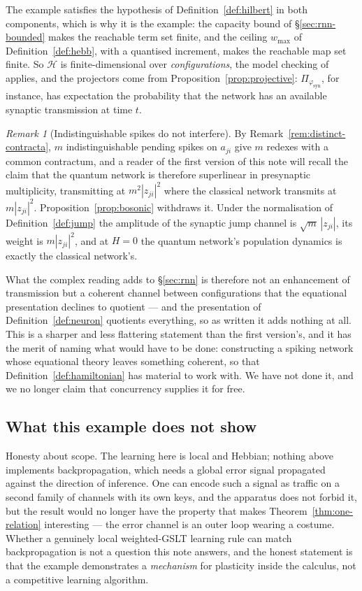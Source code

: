 \documentclass[11pt,a4paper]{article}
\theoremstyle{plain}
\theoremstyle{definition}
\theoremstyle{remark}
\newtheorem{remark}[theorem]{Remark}
\begin{document}
The example satisfies the hypothesis of Definition~\ref{def:hilbert} in both components, which is why
it is the example: the capacity bound of \S\ref{sec:rnn-bounded} makes the reachable term set finite,
and the ceiling $w_{\max}$ of Definition~\ref{def:hebb}, with a quantised increment, makes the
reachable map set finite. So $\mathcal{H}$ is finite-dimensional over \emph{configurations}, the
model checking of \cite{qctmc,qctmc-csl} applies, and the projectors come from
Proposition~\ref{prop:projective}: $\Pi_{\varphi_{\mathrm{syn}}}$, for instance, has expectation the
probability that the network has an available synaptic transmission at time $t$.

\begin{remark}[Indistinguishable spikes do not interfere]
\label{rem:bosonic}
By Remark~\ref{rem:distinct-contracta}, $m$ indistinguishable pending spikes on $a_{ji}$ give $m$
redexes with a common contractum, and a reader of the first version of this note will recall the
claim that the quantum network is therefore superlinear in presynaptic multiplicity, transmitting at
$m^2|z_{ji}|^2$ where the classical network transmits at $m|z_{ji}|^2$.
Proposition~\ref{prop:bosonic} withdraws it. Under the normalisation of Definition~\ref{def:jump} the
amplitude of the synaptic jump channel is $\sqrt{m}\,|z_{ji}|$, its weight is $m|z_{ji}|^2$, and at
$H = 0$ the quantum network's population dynamics is exactly the classical network's.

What the complex reading adds to \S\ref{sec:rnn} is therefore not an enhancement of transmission but
a coherent channel between configurations that the equational presentation declines to quotient ---
and the presentation of Definition~\ref{def:neuron} quotients everything, so as written it adds
nothing at all. This is a sharper and less flattering statement than the first version's, and it has
the merit of naming what would have to be done: constructing a spiking network whose equational
theory leaves something coherent, so that Definition~\ref{def:hamiltonian} has material to work with.
We have not done it, and we no longer claim that concurrency supplies it for free.
\end{remark}

\subsection{What this example does not show}

Honesty about scope. The learning here is local and Hebbian; nothing above implements
backpropagation, which needs a global error signal propagated against the direction of inference.
One can encode such a signal as traffic on a second family of channels with its own keys, and the
apparatus does not forbid it, but the result would no longer have the property that makes
Theorem~\ref{thm:one-relation} interesting --- the error channel is an outer loop wearing a costume.
Whether a genuinely local weighted-GSLT learning rule can match backpropagation is not a question
this note answers, and the honest statement is that the example demonstrates a \emph{mechanism} for
plasticity inside the calculus, not a competitive learning algorithm.
\end{document}
